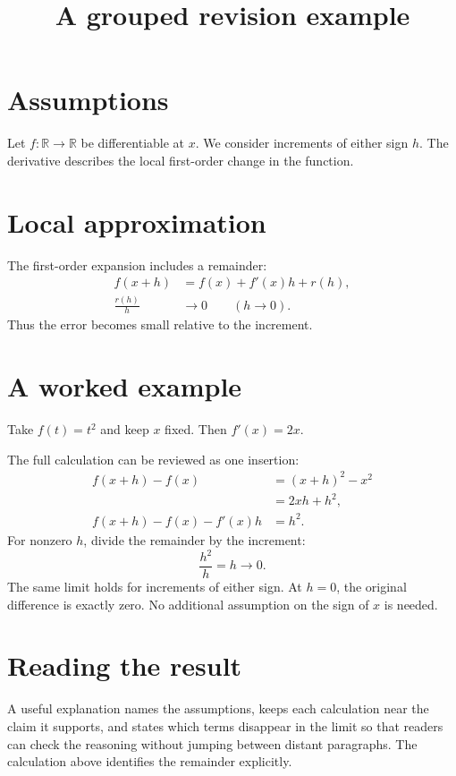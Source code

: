 \documentclass{article}
\title{A grouped revision example}
\author{}
\date{}
\begin{document}
\maketitle

\section{Assumptions}
Let \(f:\mathbb R\to\mathbb R\) be differentiable at \(x\).
We consider increments of either sign \(h\).
The derivative describes the local first-order change in the function.

\section{Local approximation}
The first-order expansion includes a remainder:
\begin{align*}
  f(x+h) &= f(x)+f'(x)h+r(h), \\
  \frac{r(h)}{h} &\longrightarrow 0
  \qquad (h\to0).
\end{align*}
Thus the error becomes small relative to the increment.

\section{A worked example}
Take \(f(t)=t^2\) and keep \(x\) fixed.
Then \(f'(x)=2x\).


The full calculation can be reviewed as one insertion:
\begin{align*}
  f(x+h)-f(x)
    &= (x+h)^2-x^2 \\
    &= 2xh+h^2, \\
  f(x+h)-f(x)-f'(x)h
    &= h^2.
\end{align*}
For nonzero \(h\), divide the remainder by the increment:
\[
  \frac{h^2}{h}=h\longrightarrow0.
\]
The same limit holds for increments of either sign.
At \(h=0\), the original difference is exactly zero.
No additional assumption on the sign of \(x\) is needed.

\section{Reading the result}
A useful explanation names the assumptions, keeps each calculation near the claim it supports, and states which terms disappear in the limit so that readers can check the reasoning without jumping between distant paragraphs.
The calculation above identifies the remainder explicitly.
\end{document}
